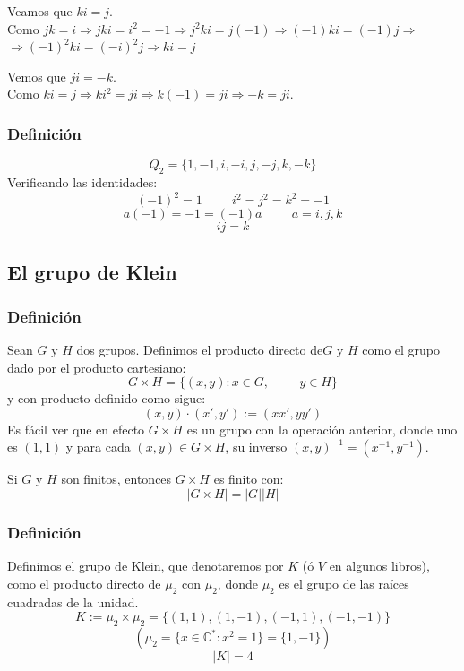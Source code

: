 \documentclass[11pt,a4paper]{article}
\begin{document}
Veamos que $ki = j$. \\
Como $jk = i \Rightarrow jki = i^{2} = -1 \Rightarrow j^{2}ki = j(-1) \Rightarrow (-1)ki = (-1)j \Rightarrow$ \\ $\Rightarrow (-1)^{2}ki = (-i)^{2}j \Rightarrow ki = j$

Vemos que $ji = -k$. \\
Como $ki = j \Rightarrow ki^{2} = ji \Rightarrow k(-1) = ji \Rightarrow -k = ji$.

\subsubsection*{Definición}

$$Q_{2} = \{1, -1, i, -i, j, -j, k, -k\}$$
Verificando las identidades:
$$(-1)^{2} = 1 \hspace{1cm} i^{2} = j^{2} = k^{2} = -1$$
$$a(-1) = -1 = (-1)a \hspace{1cm} a = i,j,k$$
$$ij = k$$

\subsection{El grupo de Klein}

\subsubsection*{Definición}

Sean $G$ y $H$ dos grupos. Definimos el producto directo de$G$ y $H$ como el grupo dado por el producto cartesiano:
$$G \times H = \{(x,y): x \in G, \hspace{1cm} y \in H\}$$
y con producto definido como sigue:
$$(x,y) \cdot (x',y') := (xx', yy')$$
Es fácil ver que en efecto $G \times H$ es un grupo con la operación anterior, donde uno es $(1,1)$ y para cada $(x,y) \in G \times H$, su inverso $(x,y)^{-1} = (x^{-1}, y^{-1})$.

Si $G$ y $H$ son finitos, entonces $G \times H$ es finito con:
$$|G \times H| = |G| |H| $$

\subsubsection*{Definición}

Definimos el grupo de Klein, que denotaremos por $K$ (ó $V$ en algunos libros), como el producto directo de $\mu_{2}$ con $\mu_{2}$, donde $\mu_{2}$ es el grupo de las raíces cuadradas de la unidad.
$$K := \mu_{2} \times \mu_{2} = \{(1,1), (1,-1), (-1,1), (-1,-1)\}$$
$$(\mu_{2} = \{x \in \mathbb{C}^{*}: x^{2} = 1\} = \{1,-1\})$$
$$ |K| = 4$$
\end{document}
